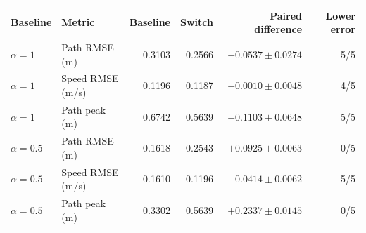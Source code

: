 \begin{tabular}{llrrrr}
\hline
Baseline & Metric & Baseline & Switch & Paired difference & Lower error \\
\hline
$\alpha=1$ & Path RMSE (m) & 0.3103 & 0.2566 & $-0.0537 \pm 0.0274$ & 5/5 \\
$\alpha=1$ & Speed RMSE (m/s) & 0.1196 & 0.1187 & $-0.0010 \pm 0.0048$ & 4/5 \\
$\alpha=1$ & Path peak (m) & 0.6742 & 0.5639 & $-0.1103 \pm 0.0648$ & 5/5 \\
$\alpha=0.5$ & Path RMSE (m) & 0.1618 & 0.2543 & $+0.0925 \pm 0.0063$ & 0/5 \\
$\alpha=0.5$ & Speed RMSE (m/s) & 0.1610 & 0.1196 & $-0.0414 \pm 0.0062$ & 5/5 \\
$\alpha=0.5$ & Path peak (m) & 0.3302 & 0.5639 & $+0.2337 \pm 0.0145$ & 0/5 \\
\hline
\end{tabular}
